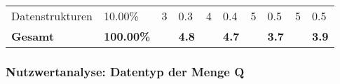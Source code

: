\begin{table}[!htp]
\begin{tabular}{llllllllll}
        Datenstrukturen                           & 10.00\%                                                                             & 3                                                                                     & 0.3                                                                                & 4                                                                                     & 0.4                                                                                & 5                                                                                     & 0.5                                                                                & 5                                                                                     & 0.5                                                                                \\
        \rowcolor[HTML]{BBDAFF}
        \textbf{Gesamt}                           & \textbf{100.00\%}                                                                   & \textbf{}                                                                             & \textbf{4.8}                                                                       & \textbf{}                                                                             & \textbf{4.7}                                                                       & \textbf{}                                                                             & \textbf{3.7}                                                                       & \textbf{}                                                                             & \textbf{3.9}
    \end{tabular}
\end{table}

\subsubsection{Nutzwertanalyse: Datentyp der Menge Q}


